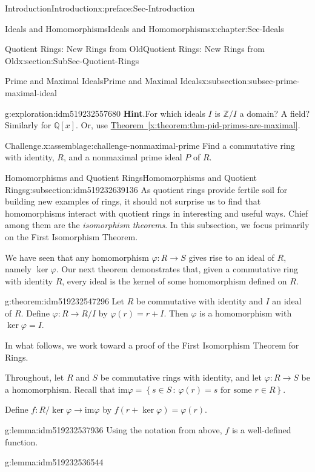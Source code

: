 \documentclass[oneside,10pt,]{book}
\newcommand{\blocktitlefont}{\relax}
\newcommand{\xreffont}{\relax}
\numberwithin{equation}{section}
\def\p{\varphi}
\def\im{\text{im}}
\newcommand{\setof}[2]{{\left\{#1\,\colon\,#2\right\}}}
\def\Z{{\mathbb Z}}
\def\Q{{\mathbb Q}}
\begin{document}
\begin{preface}{Introduction}{}{Introduction}{}{}{x:preface:Sec-Introduction}
\begin{chapterptx}{Ideals and Homomorphisms}{}{Ideals and Homomorphisms}{}{}{x:chapter:Sec-Ideals}
\begin{sectionptx}{Quotient Rings: New Rings from Old}{}{Quotient Rings: New Rings from Old}{}{}{x:section:SubSec-Quotient-Rings}
\begin{subsectionptx}{Prime and Maximal Ideals}{}{Prime and Maximal Ideals}{}{}{x:subsection:subsec-prime-maximal-ideal}
\begin{exploration}{}{g:exploration:idm519232557680}
\textbf{\blocktitlefont Hint}.\hypertarget{g:hint:idm519232556272}{}\quad{}For which ideals \(I\) is \(\Z/I\) a domain? A field? Similarly for \(\Q[x]\). Or, use \hyperref[x:theorem:thm-pid-primes-are-maximal]{Theorem~{\xreffont\ref{x:theorem:thm-pid-primes-are-maximal}}}.\end{exploration}
\begin{assemblage}{Challenge.}{x:assemblage:challenge-nonmaximal-prime}%
Find a commutative ring with identity, \(R\), and a nonmaximal prime ideal \(P\) of \(R\).%
\end{assemblage}
\end{subsectionptx}
%
%
\typeout{************************************************}
\typeout{************************************************}
%
\begin{subsectionptx}{Homomorphisms and Quotient Rings}{}{Homomorphisms and Quotient Rings}{}{}{g:subsection:idm519232639136}
As quotient rings provide fertile soil for building new examples of rings, it should not surprise us to find that homomorphisms interact with quotient rings in interesting and useful ways. Chief among them are the \emph{isomorphism theorems}. In this subsection, we focus primarily on the First Isomorphism Theorem.%
\par
We have seen that any homomorphism \(\p : R\to S\) gives rise to an ideal of \(R\), namely \(\ker\p\). Our next theorem demonstrates that, given a commutative ring with identity \(R\), every ideal is the kernel of some homomorphism defined on \(R\).%
\begin{theorem}{}{}{g:theorem:idm519232547296}%
Let \(R\) be commutative with identity and \(I\) an ideal of \(R\). Define \(\p: R\to R/I\) by \(\p(r) = r+I\). Then \(\p\) is a homomorphism with \(\ker\p = I\).%
\end{theorem}
In what follows, we work toward a proof of the First Isomorphism Theorem for Rings.%
\par
Throughout, let \(R\) and \(S\) be commutative rings with identity, and let \(\p : R\to S\) be a homomorphism. Recall that \(\im \p = \setof{s\in S}{\p(r) = s\text{ for some } r\in R}\).%
\par
Define \(f: R/\ker \p \to \im \p\) by \(f(r+\ker \p) = \p(r)\).%
\begin{lemma}{}{}{g:lemma:idm519232537936}%
Using the notation from above, \(f\) is a well-defined function.%
\end{lemma}
\begin{lemma}{}{}{g:lemma:idm519232536544}%

\end{lemma}
\end{subsectionptx}
\end{sectionptx}
\end{chapterptx}
\end{preface}
\end{document}
